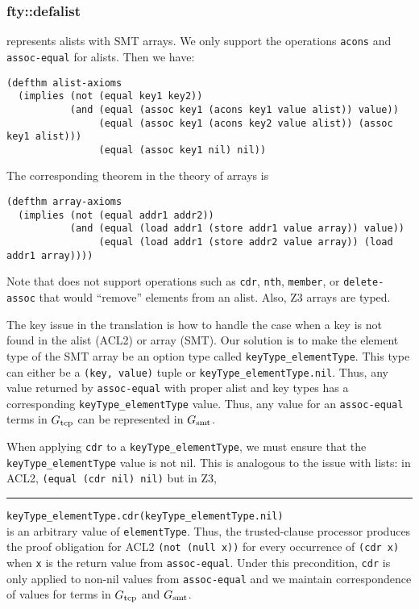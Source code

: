 \subsubsection{fty::defalist}
\smtlink{} represents alists with SMT arrays.  We only support the operations
\texttt{acons} and \texttt{assoc-equal} for alists.  Then we have:
\begin{lstlisting}[style=snippet]
(defthm alist-axioms
  (implies (not (equal key1 key2))
           (and (equal (assoc key1 (acons key1 value alist)) value))
                (equal (assoc key1 (acons key2 value alist)) (assoc key1 alist)))
                (equal (assoc key1 nil) nil))
\end{lstlisting}
The corresponding theorem in the theory of arrays is
\begin{lstlisting}[style=snippet]
(defthm array-axioms
  (implies (not (equal addr1 addr2))
           (and (equal (load addr1 (store addr1 value array)) value))
                (equal (load addr1 (store addr2 value array)) (load addr1 array))))
\end{lstlisting}
Note that \smtlink{} does not support operations such as \texttt{cdr},
\texttt{nth}, \texttt{member}, or \texttt{delete-assoc} that would
``remove'' elements from an alist. Also, Z3 arrays are typed.

The key issue in the translation is how to handle the case when a key is not found in the
alist (ACL2) or array (SMT).
Our solution is to make the element type of the SMT array be an option type called
\texttt{keyType\_elementType}.  This type can either be a \texttt{(key, value)} tuple
or \texttt{keyType\_elementType.nil}.
Thus, any value returned by \texttt{assoc-equal} with proper alist and key types
has a corresponding \texttt{keyType\_elementType} value.  Thus, any value for an
\texttt{assoc-equal} terms in $G_{\mathrm{tcp}}$ can be represented in $G_{\mathrm{smt}}$.

When applying \texttt{cdr} to a \texttt{keyType\_elementType}, we must ensure that the
\texttt{keyType\_elementType} value is not nil.  This is analogous to the issue with lists:
in ACL2, \texttt{(equal (cdr nil) nil)} but in Z3,\\
\rule{2em}{0ex}\texttt{keyType\_elementType.cdr(keyType\_elementType.nil)}\\
is an arbitrary value of \texttt{elementType}.
Thus, the trusted-clause processor produces the proof obligation for ACL2
\texttt{(not (null x))} for every occurrence of \texttt{(cdr x)} when \texttt{x} is the
return value from \texttt{assoc-equal}.
Under this precondition, \texttt{cdr} is only applied to non-nil values from
\texttt{assoc-equal} and we maintain correspondence of values for terms in
$G_{\mathrm{tcp}}$ and $G_{\mathrm{smt}}$. 

